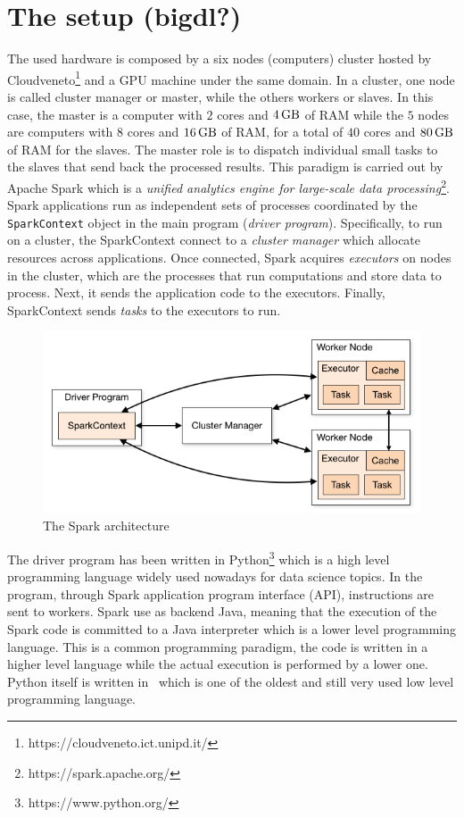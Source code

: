 \section{The setup (bigdl?)}

The used hardware is composed by a six nodes (computers) cluster hosted by
Cloudveneto\footnote{https://cloudveneto.ict.unipd.it/} and a GPU machine
under the same domain. In a cluster, one node is called cluster manager or
master, while the others workers or slaves.
In this case, the master is a computer with $2$ cores and
$\SI{4}{\giga\byte}$ of RAM while the $5$ nodes are computers with $8$
cores and $\SI{16}{\giga\byte}$ of RAM, for a total of $40$ cores and
$\SI{80}{\giga\byte}$ of RAM for the slaves.
The master role is to dispatch individual small tasks to the slaves that
send back the processed results. This paradigm is carried out by Apache
Spark\cite{spark} which is a \textit{unified analytics engine for large-scale
 data processing}\footnote{https://spark.apache.org/}.
Spark applications run as independent sets of processes coordinated by the
\lstinline{SparkContext}
object in the main program (\textit{driver program}).
Specifically, to run on a cluster, the SparkContext connect
to a \textit{cluster manager} which allocate resources across applications.
Once connected, Spark acquires \textit{executors} on nodes in the cluster,
which are the processes that run computations and store data to process.
Next, it sends the application code to the executors. Finally, SparkContext
sends \textit{tasks} to the executors to run.
\begin{figure}[htpb]
 \includegraphics[scale=0.55]{figures/cluster-overview.png}
 \caption{The Spark architecture}
 \label{}
\end{figure}

The driver program has been written in Python\footnote{https://www.python.org/}
which is a high level programming language widely used nowadays for data
science topics. In the program, through Spark application program interface
(API), instructions are sent to workers. Spark use as backend Java, meaning
that the execution of the Spark code is committed to a Java interpreter which
is a lower level programming language. This is a common programming paradigm,
the code is written in a higher level language while the actual execution is
performed by a lower one. Python itself is written in \CC~which is one of the
oldest and still very used low level programming language.

